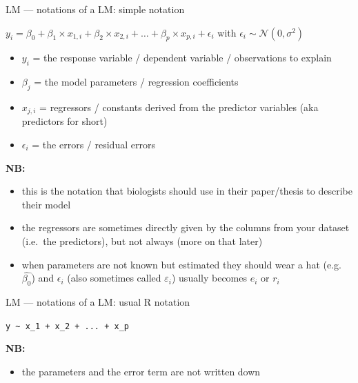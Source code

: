 \documentclass[
  10pt,
  ignorenonframetext,
  aspectratio=169,
  t]{beamer}
\providecommand{\tightlist}{%
  \setlength{\itemsep}{0pt}\setlength{\parskip}{0pt}}
\let\oldtexttt\texttt
\renewcommand{\texttt}[1]{\colorbox{gray!20}{\oldtexttt{#1}}}
\begin{document}
\begin{frame}{LM --- notations of a LM: simple notation}
\protect{}\label{lm-notations-of-a-lm-simple-notation}
\vspace{1em}

\begin{center}
$y_i = \beta_0 + \beta_1 \times x_{1,i} + \beta_2 \times x_{2,i} + \dots + \beta_{p} \times x_{p,i} + \epsilon_i$ with $\epsilon_i \sim \mathcal{N}(0, \sigma^2)$
\end{center}

\pause

\vspace{1em}

\begin{itemize}
\tightlist
\item
  \(y_i\) = the response variable / dependent variable / observations to
  explain
\item
  \(\beta_j\) = the model parameters / regression coefficients
\item
  \(x_{j,i}\) = regressors / constants derived from the predictor
  variables (aka predictors for short)
\item
  \(\epsilon_i\) = the errors / residual errors
\end{itemize}

\pause

\vspace{1em}

\textbf{NB:}

\begin{itemize}
\tightlist
\item
  this is the notation that biologists should use in their paper/thesis
  to describe their model
\item
  the regressors are sometimes directly given by the columns from your
  dataset (i.e.~the predictors), but not always (more on that later)
\item
  when parameters are not known but estimated they should wear a hat
  (e.g.~\(\hat{\beta_0}\)) and \(\epsilon_i\) (also sometimes called
  \(\varepsilon_i\)) usually becomes \(e_i\) or \(r_i\)
\end{itemize}
\end{frame}

\begin{frame}[fragile]{LM --- notations of a LM: usual R notation}
\protect{}\label{lm-notations-of-a-lm-usual-r-notation}
\vspace{1em}

\texttt{y\ \textasciitilde{}\ x\_1\ +\ x\_2\ +\ ...\ +\ x\_p}

\vspace{1em}

\textbf{NB:}

\begin{itemize}
\tightlist
\item
  the parameters and the error term are not written down
\end{itemize}
\end{frame}
\end{document}
